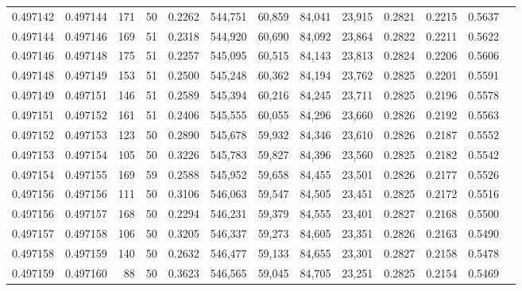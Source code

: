 \begin{tabular}{rrrrrrrrrrrrr}
0.497142 & 0.497144 &   171 &  50 &                                     0.2262 & 544,751 &  60,859 &  84,041 &  23,915 & 0.2821 & 0.2215 & 0.5637 \\
0.497144 & 0.497146 &   169 &  51 &                                     0.2318 & 544,920 &  60,690 &  84,092 &  23,864 & 0.2822 & 0.2211 & 0.5622 \\
0.497146 & 0.497148 &   175 &  51 &                                     0.2257 & 545,095 &  60,515 &  84,143 &  23,813 & 0.2824 & 0.2206 & 0.5606 \\
0.497148 & 0.497149 &   153 &  51 &                                     0.2500 & 545,248 &  60,362 &  84,194 &  23,762 & 0.2825 & 0.2201 & 0.5591 \\
0.497149 & 0.497151 &   146 &  51 &                                     0.2589 & 545,394 &  60,216 &  84,245 &  23,711 & 0.2825 & 0.2196 & 0.5578 \\
0.497151 & 0.497152 &   161 &  51 &                                     0.2406 & 545,555 &  60,055 &  84,296 &  23,660 & 0.2826 & 0.2192 & 0.5563 \\
0.497152 & 0.497153 &   123 &  50 &                                     0.2890 & 545,678 &  59,932 &  84,346 &  23,610 & 0.2826 & 0.2187 & 0.5552 \\
0.497153 & 0.497154 &   105 &  50 &                                     0.3226 & 545,783 &  59,827 &  84,396 &  23,560 & 0.2825 & 0.2182 & 0.5542 \\
0.497154 & 0.497155 &   169 &  59 &                                     0.2588 & 545,952 &  59,658 &  84,455 &  23,501 & 0.2826 & 0.2177 & 0.5526 \\
0.497156 & 0.497156 &   111 &  50 &                                     0.3106 & 546,063 &  59,547 &  84,505 &  23,451 & 0.2825 & 0.2172 & 0.5516 \\
0.497156 & 0.497157 &   168 &  50 &                                     0.2294 & 546,231 &  59,379 &  84,555 &  23,401 & 0.2827 & 0.2168 & 0.5500 \\
0.497157 & 0.497158 &   106 &  50 &                                     0.3205 & 546,337 &  59,273 &  84,605 &  23,351 & 0.2826 & 0.2163 & 0.5490 \\
0.497158 & 0.497159 &   140 &  50 &                                     0.2632 & 546,477 &  59,133 &  84,655 &  23,301 & 0.2827 & 0.2158 & 0.5478 \\
0.497159 & 0.497160 &    88 &  50 &                                     0.3623 & 546,565 &  59,045 &  84,705 &  23,251 & 0.2825 & 0.2154 & 0.5469 \\

\end{tabular}
